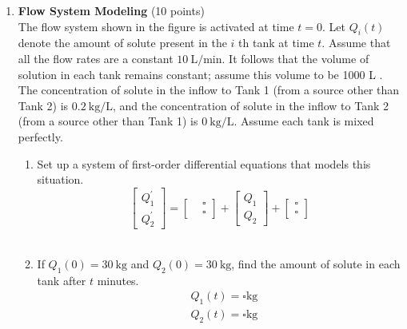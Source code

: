 \begin{enumerate}
  \newpage

  \item \textbf{Flow System Modeling} (10 points)\\
  The flow system shown in the figure is activated at time $t=0$. Let $Q_i(t)$ denote the amount of solute present in the $i$ th tank at time $t$. Assume that all the flow rates are a constant $10 \mathrm{~L} / \mathrm{min}$. It follows that the volume of solution in each tank remains constant; assume this volume to be 1000 L . The concentration of solute in the inflow to Tank 1 (from a source other than Tank 2) is $0.2 \mathrm{~kg} / \mathrm{L}$, and the concentration of solute in the inflow to Tank 2 (from a source other than Tank 1) is $0 \mathrm{~kg} / \mathrm{L}$. Assume each tank is mixed perfectly.
  \begin{enumerate}[label=\alph*]
    \item Set up a system of first-order differential equations that models this situation.\\
    $$
    \left[\begin{array}{l}
    Q_1^{\prime} \\
    Q_2^{\prime}
    \end{array}\right]=\left[\begin{array}{ll} 
    & \square \\
    & \square
    \end{array}\right]+\left[\begin{array}{l}
    Q_1 \\
    Q_2
    \end{array}\right]+\left[\begin{array}{l}
    \square \\
    \square
    \end{array}\right]
    $$\\
    \begin{subanswer}
    \end{subanswer}
    \item If $Q_1(0)=30 \mathrm{~kg}$ and $Q_2(0)=30 \mathrm{~kg}$, find the amount of solute in each tank after $t$ minutes.\\
    $$
    \begin{aligned}
    & Q_1(t)=\square \mathrm{kg} \\
    & Q_2(t)=\square \mathrm{kg}
    \end{aligned}
    $$\\
    \begin{subanswer}

\end{subanswer}
\end{enumerate}
\end{enumerate}
